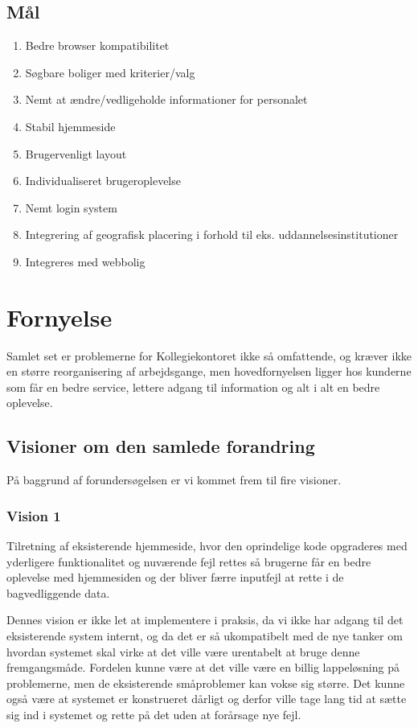 \documentclass[12pt, a4paper]{report}
\begin{document}
\subsection{Mål}
\begin{enumerate}
\item Bedre browser kompatibilitet
\item Søgbare boliger med kriterier/valg
\item Nemt at ændre/vedligeholde informationer for personalet
\item Stabil hjemmeside
\item Brugervenligt layout
\item Individualiseret brugeroplevelse
\item Nemt login system
\item Integrering af geografisk placering i forhold til eks. uddannelsesinstitutioner
\item Integreres med webbolig
\end{enumerate}


\section{Fornyelse}
Samlet set er problemerne for Kollegiekontoret ikke så omfattende, og kræver ikke en større reorganisering af arbejdsgange, men hovedfornyelsen ligger hos kunderne som får en bedre service, lettere adgang til information og alt i alt en bedre oplevelse.

\subsection{Visioner om den samlede forandring}
På baggrund af forundersøgelsen er vi kommet frem til fire visioner.

\subsubsection{Vision 1}
Tilretning af eksisterende hjemmeside, hvor den oprindelige kode opgraderes med yderligere funktionalitet og nuværende fejl rettes så brugerne får en bedre oplevelse med hjemmesiden og der bliver færre inputfejl at rette i de bagvedliggende data.

Dennes vision er ikke let at implementere i praksis, da vi ikke har adgang til det eksisterende system internt, og da det er så ukompatibelt med de nye tanker om hvordan systemet skal virke at det ville være urentabelt at bruge denne fremgangsmåde. Fordelen kunne være at det ville være en billig lappeløsning på problemerne, men de eksisterende småproblemer kan vokse sig større. Det kunne også være at systemet er konstrueret dårligt og derfor ville tage lang tid at sætte sig ind i systemet og rette på det uden at forårsage nye fejl.
\end{document}

